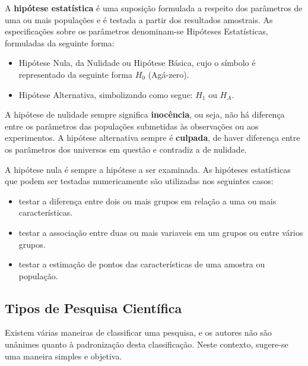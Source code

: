 A \textbf{hipótese estatística} é uma suposição formulada a respeito dos parâmetros de uma ou mais populações e é testada a partir dos resultados amostrais. As especificações sobre os parâmetros denominam-se Hipóteses Estatísticas, formuladas da seguinte forma:

\begin{itemize}
\item Hipótese Nula, da Nulidade ou Hipótese Básica, cujo o símbolo é representado da seguinte forma $H_{0}$ (Agá-zero).
\item Hipótese Alternativa, simbolizando como segue: $H_{1}$ ou $H_{A}$.
\end{itemize}

A hipótese de nulidade sempre significa \textbf{inocência}, ou seja, não há diferença entre os parâmetros das populações submetidas às observações ou aos experimentos. A hipótese alternativa sempre é \textbf{culpada}, de haver diferença entre os parâmetros dos universos em questão e contradiz a de nulidade.\vskip0.3cm



A hipótese nula é sempre a hipótese a ser examinada. As hipóteses estatísticas que podem ser testadas numericamente são utilizadas nos seguintes casos:

\begin{itemize}
\item testar a diferença entre dois ou mais grupos em relação a uma ou mais características.
\item testar a associação entre duas ou mais variaveis em um grupos ou entre vários grupos. 
\item testar a estimação de pontos das características de uma amostra ou população.
\end{itemize}


\newpage
\subsection{Tipos de Pesquisa Científica}

\inic Existem várias maneiras de classificar uma pesquisa, e os autores não são unânimes quanto à padronização desta classificação. Neste contexto, sugere-se uma maneira simples e objetiva.\vskip0.3cm 

